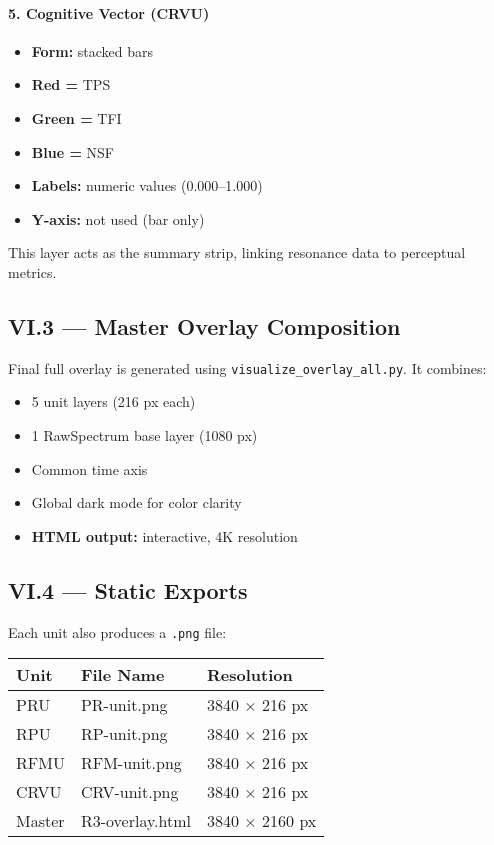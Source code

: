 \documentclass{article}
\begin{document}
\paragraph{5. Cognitive Vector (CRVU)}

\begin{itemize}
    \item \textbf{Form:} stacked bars
    \item \textbf{Red =} TPS
    \item \textbf{Green =} TFI
    \item \textbf{Blue =} NSF
    \item \textbf{Labels:} numeric values (0.000–1.000)
    \item \textbf{Y-axis:} not used (bar only)
\end{itemize}

This layer acts as the summary strip, linking resonance data to perceptual metrics.

\subsection*{VI.3 — Master Overlay Composition}

Final full overlay is generated using \texttt{visualize\_overlay\_all.py}. It combines:

\begin{itemize}
    \item 5 unit layers (216 px each)
    \item 1 RawSpectrum base layer (1080 px)
    \item Common time axis
    \item Global dark mode for color clarity
    \item \textbf{HTML output:} interactive, 4K resolution
\end{itemize}

\subsection*{VI.4 — Static Exports}

Each unit also produces a \texttt{.png} file:

\begin{center}
\begin{tabular}{|l|l|l|}
\hline
\textbf{Unit} & \textbf{File Name} & \textbf{Resolution} \\
\hline
PRU & PR-unit.png & 3840 × 216 px \\
RPU & RP-unit.png & 3840 × 216 px \\
RFMU & RFM-unit.png & 3840 × 216 px \\
CRVU & CRV-unit.png & 3840 × 216 px \\
Master & R3-overlay.html & 3840 × 2160 px \\
\hline
\end{tabular}
\end{center}
\end{document}
